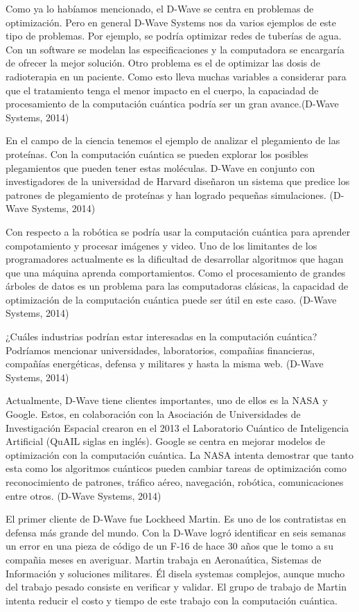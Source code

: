 \documentclass[11pt,a4paper]{article}
\begin{document}
Como ya lo habíamos mencionado, el D-Wave se centra en problemas de optimización. Pero en general D-Wave Systems nos da varios ejemplos de este tipo de problemas. Por ejemplo, se podría optimizar redes de tuberías de agua. Con un software se modelan las especificaciones y la computadora se encargaría de ofrecer la mejor solución. Otro problema es el de optimizar las dosis de radioterapia en un paciente. Como esto lleva muchas variables a considerar para que el tratamiento tenga el menor impacto en el cuerpo, la capaciadad de procesamiento de la computación cuántica podría ser un gran avance.(D-Wave Systems, 2014)

En el campo de la ciencia tenemos el ejemplo de analizar el plegamiento de las proteínas. Con la computación cuántica se pueden explorar los posibles plegamientos que pueden tener estas moléculas. D-Wave en conjunto con investigadores de la universidad de Harvard diseñaron un sistema que predice los patrones de plegamiento de proteínas y han logrado pequeñas simulaciones. (D-Wave Systems, 2014)

Con respecto a la robótica se podría usar la computación cuántica para aprender compotamiento y procesar imágenes y video. Uno de los limitantes de los programadores actualmente es la dificultad de desarrollar algoritmos que hagan que una máquina aprenda comportamientos. Como el procesamiento de grandes árboles de datos es un problema para las computadoras clásicas, la capacidad de optimización de la computación cuántica puede ser útil en este caso. (D-Wave Systems, 2014)

¿Cuáles industrias podrían estar interesadas en la computación cuántica? Podríamos mencionar universidades, laboratorios, compañias financieras, compañías energéticas, defensa y militares y hasta la misma web. (D-Wave Systems, 2014)

Actualmente, D-Wave tiene clientes importantes, uno de ellos es la NASA y Google. Estos, en colaboración con la Asociación de Universidades de Investigación Espacial crearon en el 2013 el Laboratorio Cuántico de Inteligencia Artificial (QuAIL siglas en inglés). Google se centra en mejorar modelos de optimización con la computación cuántica. La NASA intenta demostrar que tanto esta como los algoritmos cuánticos pueden cambiar tareas de optimización como reconocimiento de patrones, tráfico aéreo, navegación, robótica, comunicaciones entre otros. (D-Wave Systems, 2014)

El primer cliente de D-Wave fue Lockheed Martin. Es uno de los contratistas en defensa más grande del mundo. Con la D-Wave logró identificar en seis semanas un error en una pieza de código de un F-16 de hace 30 años que le tomo a su compañia meses en averiguar. Martin trabaja en Aeronaútica, Sistemas de Información y soluciones militares. Él disela systemas complejos, aunque mucho del trabajo pesado consiste en verificar y validar. El grupo de trabajo de Martin intenta reducir el costo y tiempo de este trabajo con la computación cuántica.
\end{document}
